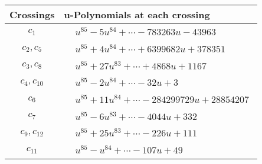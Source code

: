 \documentclass[1p]{elsarticle_modified}
\theoremstyle{definition}
\begin{document}
\begin{tabular}{m{50pt}|m{274pt}}
Crossings & \hspace{64pt}u-Polynomials at each crossing \\
\hline $$\begin{aligned}c_{1}\end{aligned}$$&$\begin{aligned}
&u^{85}-5 u^{84}+\cdots-783263 u-43963
\end{aligned}$\\
\hline $$\begin{aligned}c_{2},c_{5}\end{aligned}$$&$\begin{aligned}
&u^{85}+4 u^{84}+\cdots+6399682 u+378351
\end{aligned}$\\
\hline $$\begin{aligned}c_{3},c_{8}\end{aligned}$$&$\begin{aligned}
&u^{85}+27 u^{83}+\cdots+4868 u+1167
\end{aligned}$\\
\hline $$\begin{aligned}c_{4},c_{10}\end{aligned}$$&$\begin{aligned}
&u^{85}-2 u^{84}+\cdots-32 u+3
\end{aligned}$\\
\hline $$\begin{aligned}c_{6}\end{aligned}$$&$\begin{aligned}
&u^{85}+11 u^{84}+\cdots-284299729 u+28854207
\end{aligned}$\\
\hline $$\begin{aligned}c_{7}\end{aligned}$$&$\begin{aligned}
&u^{85}-6 u^{83}+\cdots-4044 u+332
\end{aligned}$\\
\hline $$\begin{aligned}c_{9},c_{12}\end{aligned}$$&$\begin{aligned}
&u^{85}+25 u^{83}+\cdots-226 u+111
\end{aligned}$\\
\hline $$\begin{aligned}c_{11}\end{aligned}$$&$\begin{aligned}
&u^{85}- u^{84}+\cdots-107 u+49
\end{aligned}$\\
\hline
\end{tabular}\\~\\
\end{document}
